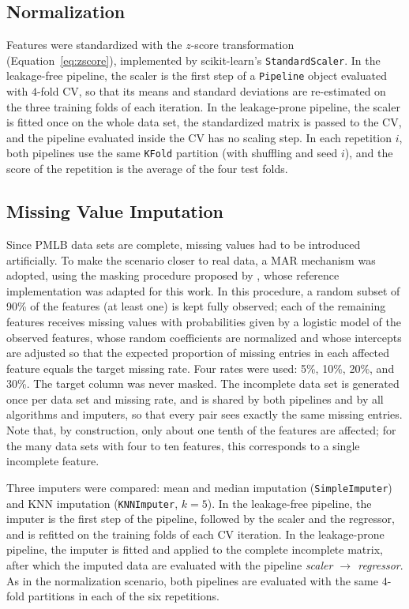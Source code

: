 \subsection{Normalization}
\label{sec:met-normalizacao}

Features were standardized with the $z$-score transformation
(Equation~\ref{eq:zscore}), implemented by scikit-learn's
\texttt{StandardScaler}. In the leakage-free pipeline, the scaler is the first
step of a \texttt{Pipeline} object evaluated with $4$-fold CV, so that its means
and standard deviations are re-estimated on the three training folds of each
iteration. In the leakage-prone pipeline, the scaler is fitted once on the whole
data set, the standardized matrix is passed to the CV, and the pipeline evaluated
inside the CV has no scaling step. In each repetition $i$, both pipelines use the
same \texttt{KFold} partition (with shuffling and seed $i$), and the score of the
repetition is the average of the four test folds.

\subsection{Missing Value Imputation}
\label{sec:met-imputacao}

Since PMLB data sets are complete, missing values had to be introduced
artificially. To make the scenario closer to real data, a MAR mechanism was adopted, using
the masking procedure proposed by , whose reference
implementation was adapted for this work. In this procedure, a random subset of
90\% of the features (at least one) is kept fully observed; each of the
remaining features receives missing values with probabilities given by a
logistic model of the observed features, whose random coefficients are
normalized and whose intercepts are adjusted so that the expected proportion of
missing entries in each affected feature equals the target missing rate. Four
rates were used: 5\%, 10\%, 20\%, and 30\%. The target column was never masked.
The incomplete data set is generated once per data set and missing rate, and is
shared by both pipelines and by all algorithms and imputers, so that every pair
sees exactly the same missing entries. Note that, by construction, only about
one tenth of the features are affected; for the many data sets with four to ten
features, this corresponds to a single incomplete feature.

Three imputers were compared: mean and median imputation
(\texttt{SimpleImputer}) and KNN imputation (\texttt{KNNImputer}, $k = 5$). In
the leakage-free pipeline, the imputer is the first step of the pipeline,
followed by the scaler and the regressor, and is refitted on the training folds
of each CV iteration. In the leakage-prone pipeline, the imputer is fitted and
applied to the complete incomplete matrix, after which the imputed data are
evaluated with the pipeline \emph{scaler $\rightarrow$ regressor}. As in the
normalization scenario, both pipelines are evaluated with the same $4$-fold
partitions in each of the six repetitions.

